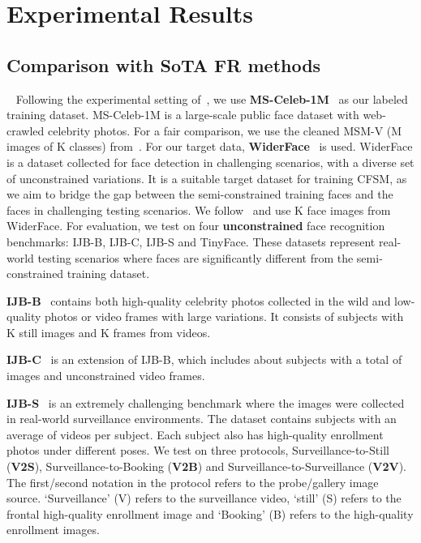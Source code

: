 

\section{Experimental Results}\label{sec:exp}


\subsection{Comparison with SoTA FR methods}~\label{sec:comparison}
Following the experimental setting of~\cite{shi2021boosting}, we use \textbf{MS-Celeb-1M}~\cite{guo2016ms} as our labeled training dataset. MS-Celeb-1M is a large-scale public face dataset with web-crawled celebrity photos. For a fair comparison, we use the cleaned MSM-V (M images of K classes) from~\cite{shi2021boosting}.
For our target data, \textbf{WiderFace}~\cite{yang2016wider} is used. WiderFace is a dataset collected for face detection in challenging scenarios, with a diverse set of unconstrained variations. It is a suitable target dataset for training CFSM, as we aim to bridge the gap between the semi-constrained training faces and the faces in challenging testing scenarios. We follow~\cite{shi2021boosting} and use K face images from WiderFace.
For evaluation, we test on four \textbf{unconstrained} face recognition benchmarks: IJB-B, IJB-C, IJB-S and TinyFace. These  datasets represent real-world testing scenarios where faces are significantly different from the semi-constrained training dataset. 


 \textbf{IJB-B}~\cite{whitelam2017iarpa} contains both high-quality celebrity photos collected in the wild and low-quality photos or video frames with large variations.  
  It consists of  subjects with K still images and K frames from  videos. 
  
 \textbf{IJB-C}~\cite{maze2018iarpa} is an extension of IJB-B, which includes about  subjects with a total of  images and  unconstrained video frames.

 \textbf{IJB-S}~\cite{kalka2018ijb} is an extremely challenging benchmark where the images were collected in real-world surveillance environments. The dataset contains  subjects with an average of  videos per subject. Each subject also has  high-quality enrollment photos under different poses. We test on three protocols, Surveillance-to-Still (\textbf{V2S}), Surveillance-to-Booking (\textbf{V2B}) and Surveillance-to-Surveillance (\textbf{V2V}). The first/second notation in the protocol refers to the probe/gallery image source. `Surveillance' (V) refers to the surveillance video, `still' (S) refers to the frontal high-quality enrollment image and `Booking' (B) refers to the  high-quality enrollment images.

